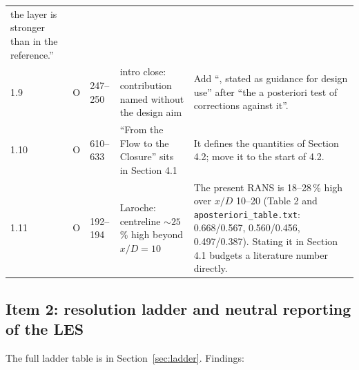 \documentclass[10pt]{article}
\newcommand{\Op}{O}
\begin{document}
{\begin{longtable}{@{}l l L{1.5cm} L{5.0cm} L{6.6cm}@{}}
the layer is stronger than in the reference.'' \\
1.9 & \Op & 247--250 & intro close: contribution named without the design aim & Add ``, stated as guidance for
design use'' after ``the a posteriori test of corrections against it''. \\
1.10 & \Op & 610--633 & ``From the Flow to the Closure'' sits in Section 4.1 & It defines the quantities of
Section 4.2; move it to the start of 4.2. \\
1.11 & \Op & 192--194 & Laroche: centreline $\sim25$\,\% high beyond $x/D=10$ & The present RANS is 18--28\,\% high
over $x/D$ 10--20 (Table 2 and \texttt{aposteriori\_table.txt}: 0.668/0.567, 0.560/0.456, 0.497/0.387). Stating
it in Section 4.1 budgets a literature number directly. \\
\bottomrule
\end{longtable}}

\subsection{Item 2: resolution ladder and neutral reporting of the LES}

The full ladder table is in Section~\ref{sec:ladder}. Findings:
\end{document}
